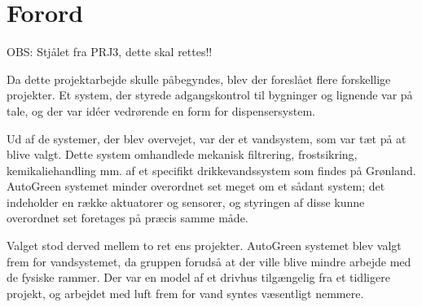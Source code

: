 \chapter{Forord}
\label{ch:Forord}

OBS: Stjålet fra PRJ3, dette skal rettes!!

Da dette projektarbejde skulle påbegyndes, blev der foreslået flere forskellige projekter. 
Et system, der styrede adgangskontrol til bygninger og lignende var på tale, og der var idéer vedrørende en form for dispensersystem.

Ud af de systemer, der blev overvejet, var der et vandsystem, som var tæt på at blive valgt. 
Dette system omhandlede mekanisk filtrering, frostsikring, kemikaliehandling mm. af et specifikt drikkevandssystem som findes på Grønland.
AutoGreen systemet minder overordnet set meget om et sådant system; det indeholder en række aktuatorer og sensorer, og styringen af disse kunne overordnet set foretages på præcis samme måde. 

Valget stod derved mellem to ret ens projekter.
AutoGreen systemet blev valgt frem for vandsystemet, da gruppen forudså at der ville blive mindre arbejde med de fysiske rammer. 
Der var en model af et drivhus tilgængelig fra et tidligere projekt, og arbejdet med luft frem for vand syntes væsentligt nemmere. 

\clearpage